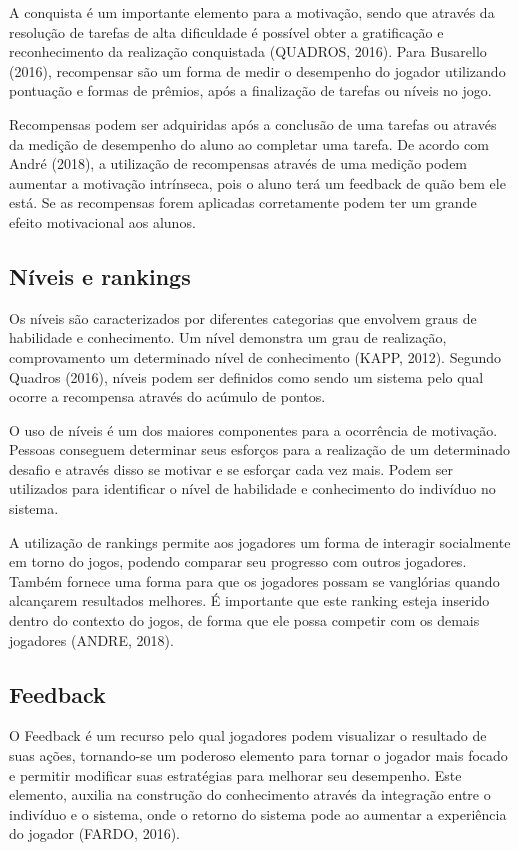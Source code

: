 \documentclass[
	12pt,				%
	oneside,			%
	a4paper,			%
	english,			%
	french,				%
	spanish,			%
	brazil,				%
	]{abntex2}
\begin{document}
A conquista é um importante elemento para a motivação, sendo que através da resolução de tarefas de alta dificuldade é possível obter a gratificação e reconhecimento da realização conquistada (QUADROS, 2016). Para Busarello (2016), recompensar são um forma de medir o desempenho do jogador utilizando pontuação e formas de prêmios, após a finalização de tarefas ou níveis no jogo.

Recompensas podem ser adquiridas após a conclusão de uma tarefas ou através da medição de desempenho do aluno ao completar uma tarefa. De acordo com André (2018), a utilização de recompensas através de uma medição podem aumentar a motivação intrínseca, pois o aluno terá um feedback de quão bem ele está. Se as recompensas forem aplicadas corretamente podem ter um grande efeito motivacional aos alunos.
    
\subsection{Níveis e rankings}        

Os níveis são caracterizados por diferentes categorias que envolvem graus de habilidade e conhecimento. Um nível demonstra um grau de realização, comprovamento um determinado nível de conhecimento (KAPP, 2012). Segundo Quadros (2016), níveis podem ser definidos como sendo um sistema pelo qual ocorre a recompensa através do acúmulo de pontos.

O uso de níveis é um dos maiores componentes para a ocorrência de motivação. Pessoas conseguem determinar seus esforços para a realização de um determinado desafio e através disso se motivar e se esforçar cada vez mais. Podem ser utilizados para identificar o nível de habilidade e conhecimento do indivíduo no sistema.

A utilização de rankings permite aos jogadores um forma de interagir socialmente em torno do jogos, podendo comparar seu progresso com outros jogadores. Também fornece uma forma para que os jogadores possam se vanglórias quando alcançarem resultados melhores. É importante que este ranking esteja inserido dentro do contexto do jogos, de forma que ele possa competir com os demais jogadores (ANDRE, 2018).
    
\subsection{Feedback}            

O Feedback é um recurso pelo qual jogadores podem visualizar o resultado de suas ações, tornando-se um poderoso elemento para tornar o jogador mais focado e permitir modificar suas estratégias para melhorar seu desempenho. Este elemento, auxilia na construção do conhecimento através da integração entre o indivíduo e o sistema, onde o retorno do sistema pode ao aumentar a experiência do jogador (FARDO, 2016).
    
\end{document}
